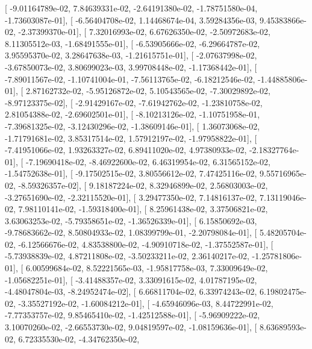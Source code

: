 \documentclass{article}
\begin{document}
       [ -9.01164789e-02,   7.84639331e-02,  -2.64191380e-02,
         -1.78751580e-04,  -1.73603087e-01],
       [ -6.56404708e-02,   1.14468674e-04,   3.59284356e-03,
          9.45383866e-02,  -2.37399370e-01],
       [  7.32016993e-02,   6.67626350e-02,  -2.50972683e-02,
          8.11305512e-03,  -1.68491555e-01],
       [ -6.53905666e-02,  -6.29664787e-02,   3.95595370e-02,
          3.28647638e-03,  -1.21615751e-01],
       [ -2.07637998e-02,  -3.67850073e-02,   3.80699023e-03,
          3.99708448e-02,  -1.17368442e-01],
       [ -7.89011567e-02,  -1.10741004e-01,  -7.56113765e-02,
         -6.18212546e-02,  -1.44885806e-01],
       [  2.87162732e-02,  -5.95126872e-02,   5.10543565e-02,
         -7.30029892e-02,  -8.97123375e-02],
       [ -2.91429167e-02,  -7.61942762e-02,  -1.23810758e-02,
          2.81054388e-02,  -2.69602501e-01],
       [ -8.10213126e-02,  -1.10751958e-01,  -7.39681325e-02,
         -3.12430296e-02,  -1.38609146e-01],
       [  1.36073068e-02,  -1.71791681e-02,   3.85317514e-02,
          1.57912197e-02,  -1.97958822e-01],
       [ -7.41951066e-02,   1.93263327e-02,   6.89411020e-02,
          4.97380933e-02,  -2.18327764e-01],
       [ -7.19690418e-02,  -8.46922600e-02,   6.46319954e-02,
          6.31565152e-02,  -1.54752638e-01],
       [ -9.17502515e-02,   3.80556612e-02,   7.47425116e-02,
          9.55716965e-02,  -8.59326357e-02],
       [  9.18187224e-02,   8.32946899e-02,   2.56803003e-02,
         -3.27651690e-02,  -2.32115520e-01],
       [  3.29477350e-02,   7.14816137e-02,   7.13119046e-02,
          7.98110141e-02,  -1.59318400e-01],
       [  8.25961438e-02,   3.37506821e-02,   3.63063253e-02,
         -5.79358651e-02,  -1.36526339e-01],
       [  6.15850692e-03,  -9.78683662e-02,   8.50804933e-02,
          1.08399799e-01,  -2.20798084e-01],
       [  5.48205704e-02,  -6.12566676e-02,   4.83538800e-02,
         -4.90910718e-02,  -1.37552587e-01],
       [ -5.73938839e-02,   4.87211808e-02,  -3.50233211e-02,
          2.36140217e-02,  -1.25781806e-01],
       [  6.00599684e-02,   8.52221565e-03,  -1.95817758e-03,
          7.33009649e-02,  -1.05682251e-01],
       [ -3.41488357e-02,   3.33091615e-02,   4.01787195e-02,
         -4.48047804e-03,  -8.24952474e-02],
       [  6.66811704e-02,   6.33974243e-02,   6.19802475e-02,
         -3.35527192e-02,  -1.60084212e-01],
       [ -4.65946096e-03,   8.44722991e-02,  -7.77353757e-02,
          9.85465410e-02,  -1.42512588e-01],
       [ -5.96909222e-02,   3.10070260e-02,  -2.66553730e-02,
          9.04819597e-02,  -1.08159636e-01],
       [  8.63689593e-02,   6.72335530e-02,  -4.34762350e-02,
\end{document}

